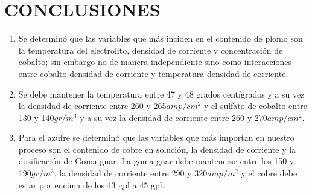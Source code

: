 \chapter{CONCLUSIONES}

\begin{enumerate}
 \item Se determin\'o que las variables que m\'as inciden en el contenido de plomo son la temperatura del electrolito, densidad de corriente y concentraci\'on de cobalto; sin embargo no de manera independiente sino como interacciones entre cobalto-densidad de corriente y temperatura-densidad de corriente.
 \item Se debe mantener la temperatura entre 47 y 48 grados cent\'igrados y a su vez la densidad de corriente entre 260 y 265$amp/cm^2$ y el sulfato de cobalto entre 130 y 140$gr/m^3$ y a su vez la densidad de corriente entre 260 y 270$amp/cm^2$.
 \item  Para el azufre se determin\'o que las variables que m\'as importan en nuestro proceso son el contenido de cobre en soluci\'on, la densidad de corriente y la dosificaci\'on de Goma guar. La goma guar debe mantenerse entre los 150 y 190$gr/m^3$, la densidad de corriente entre 290 y 320$amp/m^2$ y el cobre debe estar por encima de los 43 gpl a 45 gpl.
\end{enumerate}
